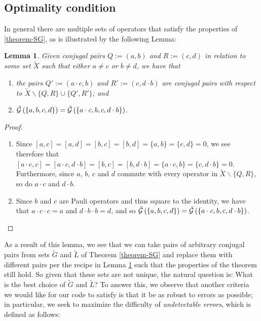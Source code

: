 \documentclass[twocolumn,showpacs,preprintnumbers,amsmath,amssymb,nofootinbib,pra,floatfix]{revtex4-1}
\newtheorem{lemma}{Lemma}
\newcommand{\set}{\tilde}
\newcommand{\genfun}{\tilde{\mathcal{G}}}
\begin{document}
\subsection{Optimality condition}

\label{optimal-generators}

In general there are multiple sets of operators that satisfy the properties of \ref{theorem-SG}, as is illustrated by the following Lemma:

\begin{lemma}
\label{combining-pairs}
Given conjugal pairs $Q:=(a,b)$ and $R:=(c,d)$ in relation to some set $\set X$ such that either $a\ne c$ or $b\ne d$, we have that
\begin{enumerate}
\item the pairs $Q':=(a\cdot c,b)$ and $R':=(c,d\cdot b)$ are conjugal pairs with respect to $\set X \backslash \{Q,R\} \cup \{Q',R'\}$; and
\item $\genfun\paren{\{a,b,c,d\}}=\genfun\paren{\{a\cdot c,b,c,d\cdot b\}}$.
\end{enumerate}
\end{lemma}

\begin{proof}
\begin{enumerate}
\item Since $[a,c]=[a,d]=[b,c]=[b,d]=\{a,b\}=\{c,d\}=0$, we see therefore that $[a\cdot c,c]=[a\cdot c,d\cdot b]=[b,c]=[b,d\cdot b]=\{a\cdot c,b\}=\{c,d\cdot b\}=0$.  Furthermore, since $a$, $b$, $c$ and $d$ commute with every operator in $\set X\backslash \{Q,R\}$, so do $a\cdot c$ and $d\cdot b$.
\item Since $b$ and $c$ are Pauli operators and thus square to the identity, we have that $a\cdot c\cdot c=a$ and $d\cdot b\cdot b=d$, and so $\genfun\paren{\{a,b,c,d\}}=\genfun\paren{\{a\cdot c,b,c,d\cdot b\}}$.
\end{enumerate}
\end{proof}
As a result of this lemma, we see that we can take pairs of arbitrary conjugal pairs from sets $\set G$ and $\set L$ of Theorem \ref{theorem-SG} and replace them with different pairs per the recipe in Lemma \ref{combining-pairs} such that the properties of the theorem still hold.  So given that these sets are not unique, the natural question is:  What is the best choice of $\set G$ and $\set L$?  To answer this, we observe that another criteria we would like for our code to satisfy is that it be as robust to errors as possible;  in particular, we seek to maximize the difficulty of \emph{undetectable errors}, which is defined as follows:
\end{document}
